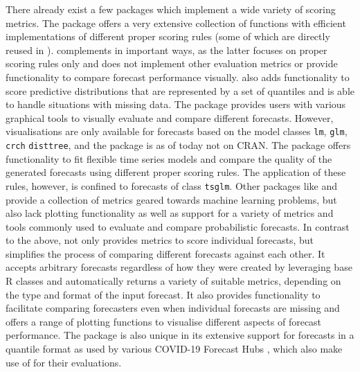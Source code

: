 \documentclass[
]{jss}
\begin{document}
There already exist a few  \citep{R} packages which
implement a wide variety of scoring metrics. The 
package \citep{scoringRules} offers a very extensive collection of
functions with efficient implementations of different proper scoring
rules (some of which are directly reused in ).
 complements  in important ways, as
the latter focuses on proper scoring rules only and does not implement
other evaluation metrics or provide functionality to compare forecast
performance visually.  also adds functionality to
score predictive distributions that are represented by a set of
quantiles and is able to handle situations with missing data. The
 package \citep{topmodels} provides users with various
graphical tools to visually evaluate and compare different forecasts.
However, visualisations are only available for forecasts based on the
model classes \texttt{lm}, \texttt{glm}, \texttt{crch}
\texttt{disttree}, and the package is as of today not on CRAN. The
 package \citep{tscount} offers functionality to fit
flexible time series models and compare the quality of the generated
forecasts using different proper scoring rules. The application of these
rules, however, is confined to forecasts of class \texttt{tsglm}. Other
packages like  \citep{Metrics} and 
\citep{MLmetrics} provide a collection of metrics geared towards machine
learning problems, but also lack plotting functionality as well as
support for a variety of metrics and tools commonly used to evaluate and
compare probabilistic forecasts. In contrast to the above,
 not only provides metrics to score individual
forecasts, but simplifies the process of comparing different forecasts
against each other. It accepts arbitrary forecasts regardless of how
they were created by leveraging base R classes and automatically returns
a variety of suitable metrics, depending on the type and format of the
input forecast. It also provides functionality to facilitate comparing
forecasters even when individual forecasts are missing and offers a
range of plotting functions to visualise different aspects of forecast
performance. The  package is also unique in its
extensive support for forecasts in a quantile format as used by various
COVID-19 Forecast Hubs
\citep{cramerEvaluationIndividualEnsemble2021, bracherShorttermForecastingCOVID192021, europeancovid-19forecasthubEuropeanCovid19Forecast2021, bracherNationalSubnationalShortterm2021},
which also make use of  for their evaluations.
\end{document}
